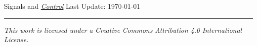 \documentclass[12pt,a4paper]{article}
\begin{document}
\begin{titlepage}
\centering 
{\Huge Signals and \textit{\underline{Control}}}
\vfill
Last Update: \today
\vspace{1cm}
\hrule
\vspace{1cm}
\textit{This work is licensed under a Creative Commons Attribution 4.0 International License.}
\end{titlepage}

\newpage

\newpage
\tableofcontents
\newpage














\end{document}
